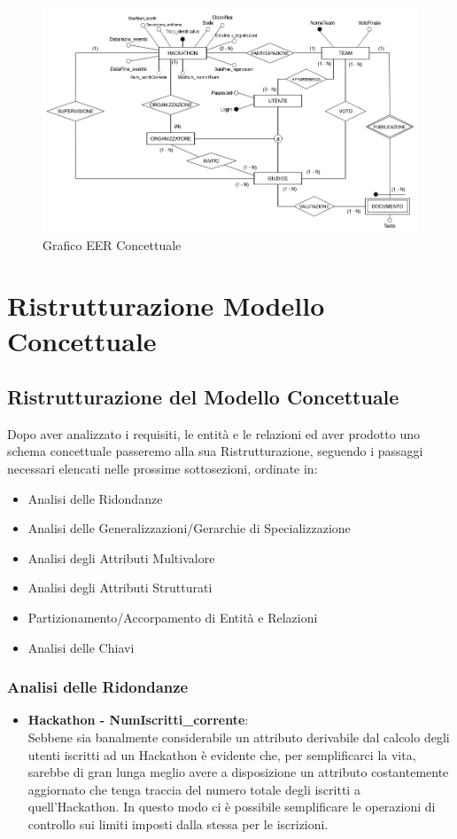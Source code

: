 \documentclass[a4paper, 10pt]{article}
\begin{document}
	\begin{figure}[H]
		\centering
		\includegraphics[width=1\textwidth]{../Immagini/EERDiagram_Hackathon}
		\caption[Grafico UML]{Grafico EER Concettuale}
	\end{figure}
	\newpage
	\section{Ristrutturazione Modello Concettuale}
	\subsection{Ristrutturazione del Modello Concettuale}
	Dopo aver analizzato i requisiti, le entità e le relazioni ed aver prodotto uno schema concettuale passeremo alla sua Ristrutturazione, seguendo i passaggi necessari elencati nelle prossime sottosezioni, ordinate in:
	\begin{itemize}
		\item Analisi delle Ridondanze
		\item Analisi delle Generalizzazioni/Gerarchie di Specializzazione
		\item Analisi degli Attributi Multivalore
		\item Analisi degli Attributi Strutturati
		\item Partizionamento/Accorpamento di Entità e Relazioni
		\item Analisi delle Chiavi
	\end{itemize}
	\subsubsection{Analisi delle Ridondanze}
	\begin{itemize}
		\item \textbf{Hackathon - NumIscritti\_corrente}:\\Sebbene sia banalmente considerabile un attributo derivabile dal calcolo degli utenti iscritti ad un Hackathon è evidente che, per semplificarci la vita, sarebbe di gran lunga meglio avere a disposizione un attributo costantemente aggiornato che tenga traccia del numero totale degli iscritti a quell'Hackathon. In questo modo ci è possibile semplificare le operazioni di controllo sui limiti imposti dalla stessa per le iscrizioni.
	\end{itemize}
\end{document}
